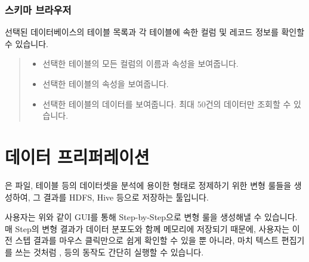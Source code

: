 \documentclass[letterpaper,10pt,english]{sphinxmanual}
\begin{document}
\subsection{스키마 브라우저}
\label{\detokenize{discovery/part06/06_03-use_a_workbench:workbench-use-6}}\label{\detokenize{discovery/part06/06_03-use_a_workbench:id11}}
선택된 데이터베이스의 테이블 목록과 각 테이블에 속한 컬럼 및 레코드 정보를 확인할 수 있습니다.
\begin{quote}

\begin{figure}[H]
\centering

\noindent{}
\end{figure}
\begin{itemize}
\item {} 
 선택한 테이블의 모든 컬럼의 이름과 속성을 보여줍니다.

\item {} 
 선택한 테이블의 속성을 보여줍니다.

\item {} 
 선택한 테이블의 데이터를 보여줍니다. 최대 50건의 데이터만 조회할 수 있습니다.

\end{itemize}
\end{quote}


\chapter{데이터 프리퍼레이션}
\label{\detokenize{discovery/part07/index:id1}}\label{\detokenize{discovery/part07/index::doc}}
은 파일, 테이블 등의 데이터셋을 분석에 용이한 형태로 정제하기 위한 변형 룰들을 생성하여, 그 결과를 HDFS, Hive 등으로 저장하는 툴입니다.

\begin{quote}

\begin{figure}[H]
\centering

\noindent{}
\end{figure}
\end{quote}

사용자는 위와 같이 GUI를 통해 Step-by-Step으로 변형 룰을 생성해낼 수 있습니다. 매 Step의 변형 결과가 데이터 분포도와 함께 메모리에 저장되기 때문에, 사용자는 이전 스텝 결과를 마우스 클릭만으로 쉽게 확인할 수 있을 뿐 아니라, 마치 텍스트 편집기를 쓰는 것처럼 ,  등의 동작도 간단히 실행할 수 있습니다.
\end{document}
